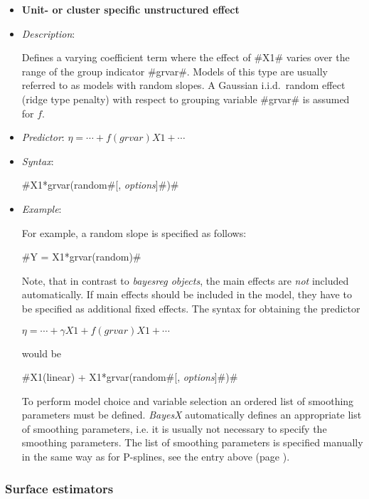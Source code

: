 \begin{itemize}
\item[]{\bf\sffamily Unit- or cluster specific unstructured
effect}

\item[] {\em Description}:

Defines a varying coefficient term where the effect of #X1# varies over the range of the group indicator #grvar#. Models of
this type are usually referred to as models with random slopes. A Gaussian i.i.d.~random effect (ridge type penalty)  with
respect to grouping variable #grvar# is assumed for $f$.
\item[] {\em Predictor}: $\eta = \cdots + f(grvar)X1 + \cdots$
\item[] {\em Syntax}:

#X1*grvar(random#[, {\em options}]#)#
\item[] {\em Example}:

For example, a random slope is specified as follows:

#Y = X1*grvar(random)#

Note, that in contrast to {\em bayesreg objects}, the main effects
are {\em not} included automatically. If main effects should be
included in the model, they have to be specified as additional
fixed effects. The syntax for obtaining the predictor

$\eta = \cdots + \gamma X1 + f(grvar)X1 + \cdots$

would be

#X1(linear) + X1*grvar(random#[, {\em options}]#)#

To perform model choice and variable selection an ordered list of smoothing parameters must be defined. {\em BayesX} automatically defines an appropriate list of smoothing
parameters, i.e. it is usually not necessary to  specify the smoothing parameters. The list of smoothing parameters is
specified manually in the same way as for P-splines, see the entry above (page \pageref{psplines_stepwise}).
\end{itemize}

\subsubsection*{Surface estimators}

